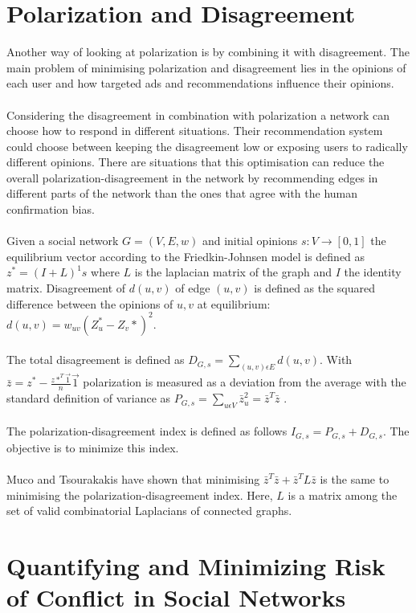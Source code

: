 \section{Polarization and Disagreement}
\label{sec:polarizationDisareement}

Another way of looking at polarization is by combining it with disagreement. The main problem of minimising polarization and disagreement lies in the opinions of each user and how targeted ads and recommendations influence their opinions. 
\\
\\
Considering the disagreement in combination with polarization a network can choose how to respond in different situations. Their recommendation system could choose between keeping the disagreement low or exposing users to radically different opinions. There are situations that this optimisation can reduce the overall polarization-disagreement in the network by recommending edges in different parts of the network than the ones that agree with the human confirmation bias. 
\\
\\
Given a social network $G = (V,E,w)$ and initial opinions $s: V \rightarrow [0,1]$ the equilibrium vector according to the Friedkin-Johnsen model is defined as $z^*=(I+L)^1s$ where $L$ is the laplacian matrix of the graph and $I$ the identity matrix. Disagreement of $d(u,v)$ of edge $(u,v)$ is defined as the squared difference between the opinions of $u,v$ at equilibrium: $d(u,v) = w_{uv}(Z_u^* - Z_v*)^2.$ 
\\
\\
The total disagreement is defined as $D_{G,s} = \sum_{(u,v) \epsilon E} d(u,v)$. With $\bar z = z^* - \frac{z*^T \overrightarrow 1}{n}\overrightarrow 1$ polarization is measured as a deviation from the average with the standard definition of variance as $P_{G,s} = \sum_{u\epsilon V} \bar z_u^2 = \bar z^T \bar z$ .
\\
\\
The polarization-disagreement index is defined as follows $I_{G,s} = P_{G,s} +D_{G,s}$. The objective is to minimize this index. 
\\
\\
Muco and Tsourakakis have shown that minimising $\bar z^T \bar z + \bar z^T L\bar z$ is the same to minimising the polarization-disagreement index. Here, $L$ is a matrix among the set of valid combinatorial Laplacians of connected graphs.\cite{musco}

\section{Quantifying and Minimizing Risk of Conflict in Social Networks}
\label{sec:riskOfConflict}


